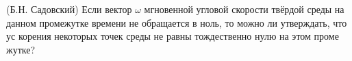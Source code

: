 (Б.Н. Садовский)
Если вектор $\omega$ мгновенной угловой скорости твёрдой среды на данном 
промежутке времени не обращается в ноль, то можно ли утверждать, что ус
корения некоторых точек среды не равны тождественно нулю на этом проме
жутке?


